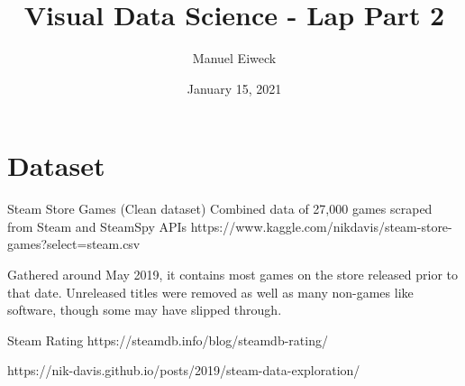 \documentclass{article}
\title{Visual Data Science - Lap Part 2}
\author{Manuel Eiweck}
\date{January 15, 2021}
\begin{document}
\maketitle


\section{Dataset}

Steam Store Games (Clean dataset)
Combined data of 27,000 games scraped from Steam and SteamSpy APIs
https://www.kaggle.com/nikdavis/steam-store-games?select=steam.csv

Gathered around May 2019, it contains most games on the store released prior to that date. Unreleased titles were removed as well as many non-games like software, though some may have slipped through.

Steam Rating
https://steamdb.info/blog/steamdb-rating/

https://nik-davis.github.io/posts/2019/steam-data-exploration/
\end{document}
